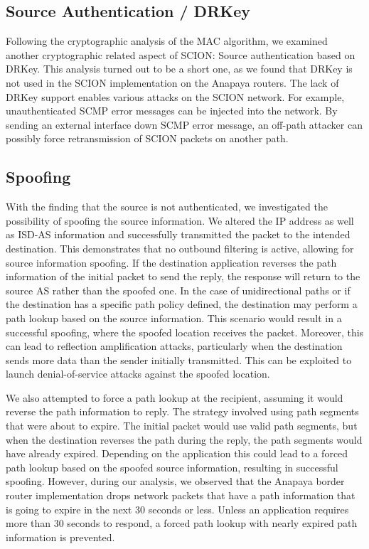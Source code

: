 \subsection{Source Authentication / DRKey}
Following the cryptographic analysis of the MAC algorithm, we examined another cryptographic related aspect of SCION: Source authentication based on DRKey.
This analysis turned out to be a short one, as we found that DRKey is not used in the SCION implementation on the Anapaya routers.
The lack of DRKey support enables various attacks on the SCION network.
For example, unauthenticated SCMP error messages can be injected into the network.
By sending an external interface down SCMP error message, an off-path attacker can possibly force retransmission of SCION packets on another path.



\subsection{Spoofing}
With the finding that the source is not authenticated, we investigated the possibility of spoofing the source information.
We altered the IP address as well as ISD-AS information and successfully transmitted the packet to the intended destination.
This demonstrates that no outbound filtering is active, allowing for source information spoofing.
If the destination application reverses the path information of the initial packet to send the reply, the response will return to the source AS rather than the spoofed one.
In the case of unidirectional paths or if the destination has a specific path policy defined, the destination may perform a path lookup based on the source information.
This scenario would result in a successful spoofing, where the spoofed location receives the packet.
Moreover, this can lead to reflection amplification attacks, particularly when the destination sends more data than the sender initially transmitted.
This can be exploited to launch denial-of-service attacks against the spoofed location.

We also attempted to force a path lookup at the recipient, assuming it would reverse the path information to reply.
The strategy involved using path segments that were about to expire.
The initial packet would use valid path segments, but when the destination reverses the path during the reply, the path segments would have already expired.
Depending on the application this could lead to a forced path lookup based on the spoofed source information, resulting in successful spoofing.
However, during our analysis, we observed that the Anapaya border router implementation drops network packets that have a path information that is going to expire in the next 30 seconds or less.
Unless an application requires more than 30 seconds to respond, a forced path lookup with nearly expired path information is prevented.

